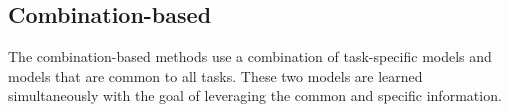 

\subsection{Combination-based}
The combination-based methods 
use a combination of task-specific models and models that are common to all tasks. These two models are learned simultaneously with the goal of leveraging the common and specific information.


